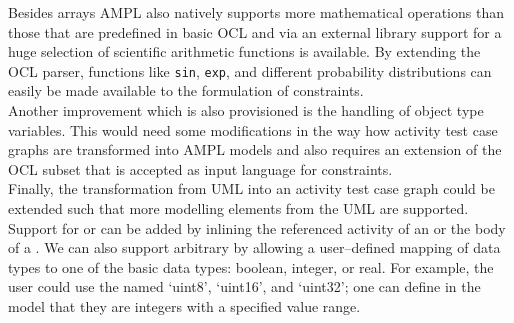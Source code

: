 Besides arrays AMPL also natively supports more mathematical operations than those that are predefined in basic OCL and via an external library support for a huge selection of scientific arithmetic functions is available. By extending the OCL parser, functions like \texttt{sin}, \texttt{exp}, and different probability distributions can easily be made available to the formulation of constraints.\\
Another improvement which is also provisioned is the handling of object type variables. This would need some modifications in the way how activity test case graphs are transformed into AMPL models and also requires an extension of the OCL subset that is accepted as input language for constraints.\\
Finally, the transformation from UML into an activity test case graph could be extended such that more modelling elements from the UML are supported. Support for  or  can be added by inlining the referenced activity of an  or the body of a . We can also support arbitrary  by allowing a user--defined mapping of data types to one of the basic data types: boolean, integer, or real. For example, the user could use the  named `uint8', `uint16', and `uint32'; one can define in the model that they are integers with a specified value range.
